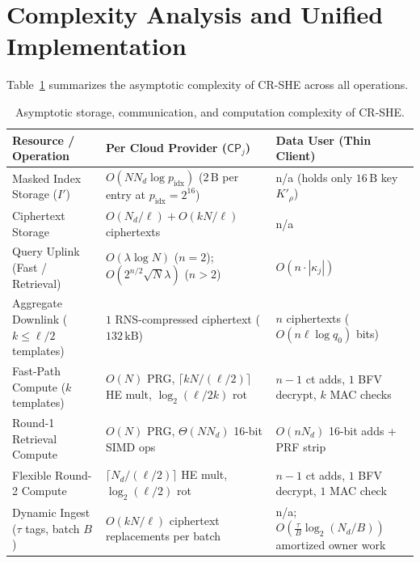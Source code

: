 \documentclass[11pt,a4paper]{article}
\begin{document}
\section{Complexity Analysis and Unified Implementation}\label{sec:complexity}\label{sec:impl}

Table~\ref{tab:asymptotic} summarizes the asymptotic complexity of CR-SHE across all operations.

\begin{table}[t!]
\centering
\small
\renewcommand{\arraystretch}{1.15}
\begin{tabularx}{\textwidth}{lXX}
\toprule
\textbf{Resource / Operation} & \textbf{Per Cloud Provider ($\mathsf{CP}_j$)} & \textbf{Data User (Thin Client)} \\
\midrule
Masked Index Storage ($I'$) & $O(N N_d \log p_{\mathrm{idx}})$ ($2\,\text{B}$ per entry at $p_{\mathrm{idx}}=2^{16}$) & n/a (holds only $16\,\text{B}$ key $K'_\rho$) \\
Ciphertext Storage & $O(N_d / \ell) + O(kN / \ell)$ ciphertexts & n/a \\
Query Uplink (Fast / Retrieval) & $O(\lambda \log N)$ ($n=2$); $O(2^{n/2}\sqrt{N}\lambda)$ ($n > 2$) & $O(n \cdot |\kappa_j|)$ \\
Aggregate Downlink ($k \le \ell/2$ templates) & $1$ RNS-compressed ciphertext ($132\,\text{kB}$) & $n$ ciphertexts ($O(n \ell \log q_0)$ bits) \\
Fast-Path Compute ($k$ templates) & $O(N)$ PRG, $\lceil kN / (\ell/2)\rceil$ HE mult, $\log_2(\ell/2k)$ rot & $n-1$ ct adds, $1$ BFV decrypt, $k$ MAC checks \\
Round-1 Retrieval Compute & $O(N)$ PRG, $\Theta(N N_d)$ 16-bit SIMD ops & $O(n N_d)$ 16-bit adds + PRF strip \\
Flexible Round-2 Compute & $\lceil N_d / (\ell/2)\rceil$ HE mult, $\log_2(\ell/2)$ rot & $n-1$ ct adds, $1$ BFV decrypt, $1$ MAC check \\
Dynamic Ingest ($\tau$ tags, batch $B$) & $O(kN/\ell)$ ciphertext replacements per batch & n/a; $O(\frac{\tau}{B}\log_2(N_d/B))$ amortized owner work \\
\bottomrule
\end{tabularx}
\caption{Asymptotic storage, communication, and computation complexity of CR-SHE.}
\label{tab:asymptotic}
\end{table}
\end{document}
